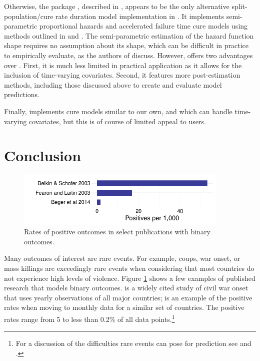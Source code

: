 \documentclass[article]{jss}
\begin{document}
Otherwise, the  package \citep{cai2012smcureR}, described in \citet{cai2012smcure}, appears to be the only alternative split-population/cure rate duration model implementation in . It implements semi-parametric proportional hazards and accelerated failure time cure models using methods outlined in \citep{peng2003fitting} and \citep{zhang2007new}. The semi-parametric estimation of the hazard function shape requires no assumption about its shape, which can be difficult in practice to empirically evaluate, as the authors of  discuss. However,  offers two advantages over . First, it is much less limited in practical application as it allows for the inclusion of time-varying covariates. Second, it features more post-estimation methods, including those discussed above to create and evaluate model predictions.  

Finally,  implements cure models similar to our own, and which can handle time-varying covariates, but this is of course of limited appeal to  users. 

\section{Conclusion}

\begin{figure}[htbp!]
\centering
\includegraphics[width = 4in]{graphics/rates.pdf}
\caption{Rates of positive outcomes in select publications with binary outcomes.}
\label{rates}
\end{figure}

Many outcomes of interest are rare events. For example, coups, war
onset, or mass killings are exceedingly rare events when considering
that most countries do not experience high levels of violence. Figure
\ref{rates} shows a few examples of published research that models
binary outcomes. \citet{fearon2003ethnicity} is a widely cited study of
civil war onset that uses yearly observations of all major countries;
\citet{beger2014ensemble} is an example of the positive rates when
moving to monthly data for a similar set of countries. The positive
rates range from 5 to less than 0.2\% of all data points.\footnote{For a
  discussion of the difficulties rare events can pose for prediction see
  \citet{king2001explaining} and \citet{king2001logistic}.}
\end{document}
